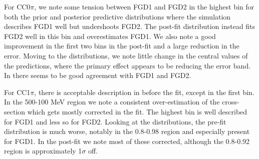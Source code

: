 For CC0$\pi$, we note some tension between FGD1 and FGD2 in the highest \pmu bin for both the prior and posterior predictive distributions where the simulation describes FGD1 well but undershoots FGD2. The post-fit distribution instead fits FGD2 well in this bin and overestimates FGD1. We also note a good improvement in the first two \pmu bins in the post-fit and a large reduction in the error. Moving to the \cosmu distributions, we note little change in the central values of the predictions, where the primary effect appears to be reducing the error band. In \cosmu there seems to be good agreement with FGD1 and FGD2.

For CC1$\pi$, there is acceptable description in \pmu before the fit, except in the first bin. In the 500-100 MeV region we note a consistent over-estimation of the cross-section which gets mostly corrected in the fit. The highest bin is well described for FGD1 and less so for FGD2. Looking at the \cosmu distributions, the pre-fit distribution is much worse, notably in the 0.8-0.98 region and especially present for FGD1. In the post-fit we note most of these corrected, although the 0.8-0.92 region is approximately 1$\sigma$ off.
